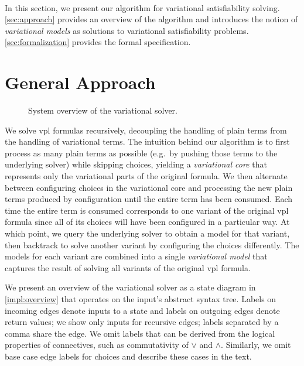 ~\label{chapter:vsat}

In this section, we present our algorithm for variational satisfiability
solving. \autoref{sec:approach} provides an overview of the algorithm and
introduces the notion of \emph{variational models} as solutions to variational
satisfiability problems. \autoref{sec:formalization} provides the formal
specification.


\section{General Approach}
\label{sec:approach}

\begin{figure}
  \centering
    
    \caption{System overview of the variational solver.}%
    \label{impl:overview}
\end{figure}

We solve \ac{vpl} formulas recursively, decoupling the handling of plain
terms from the handling of variational terms.
%
The intuition behind our algorithm is to first process as many plain terms as
possible (e.g.\ by pushing those terms to the underlying solver) while skipping
choices, yielding a \emph{variational core} that represents only the
variational parts of the original formula. We then alternate between
configuring choices in the variational core and processing the new plain terms
produced by configuration until the entire term has been consumed.
%
Each time the entire term is consumed corresponds to one variant of the
original \ac{vpl} formula since all of its choices will have been configured in a
particular way. At which point, we query the underlying solver to obtain a
model for that variant, then backtrack to solve another variant by configuring
the choices differently. The models for each variant are combined into a single
\emph{variational model} that captures the result of solving all variants of
the original \ac{vpl} formula.


We present an overview of the variational solver as a state diagram in
\autoref{impl:overview} that operates on the input's abstract syntax tree.
Labels on incoming edges denote inputs to a state and labels on outgoing edges
denote return values; we show only inputs for recursive edges; labels separated
by a comma share the edge. We omit labels that can be derived from the logical
properties of connectives, such as commutativity of $\vee$ and $\wedge$.
Similarly, we omit base case edge labels for choices and describe these cases
in the text.

